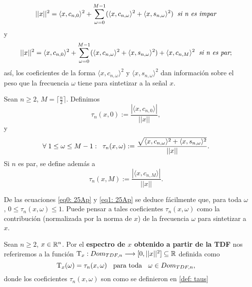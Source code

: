 \begin{equation}
\label{eq0: 25Ap}
||x||^{2} = \langle x , c_{n,0} \rangle^{2}+
\sum\limits_{\omega=0}^{M-1}(\langle x , c_{n,\omega} \rangle^{2} + 
\langle x , s_{n,\omega} \rangle^{2})
\hspace{0.2cm} \textit{si n es impar} 
\end{equation}
y
\begin{equation}
\label{eq1: 25Ap}
||x||^{2} = \langle x , c_{n,0} \rangle^{2}+
\sum\limits_{\omega=0}^{M-1}(\langle x , c_{n,\omega} \rangle^{2} + 
\langle x , s_{n,\omega} \rangle^{2})
+ \langle x , c_{n,M} \rangle^{2}
\hspace{0.2cm} \textit{si n es par};
\end{equation}
así, los coeficientes de la forma
$\langle x , c_{n,\omega} \rangle^{2}$ y 
$\langle x , s_{n,\omega} \rangle^{2}$
dan información sobre el peso que la frecuencia
$\omega$ tiene para sintetizar a la señal $x$.


\begin{defi}
\label{def: taus}
Sean $n \geq 2$, $M = \lceil \frac{n}{2} \rceil $.
Definimos
	\[
	\tau_{n}(x, 0) := \frac{|\langle x, c_{n,0} \rangle|}{|| x ||} ,	
	\]
	y
	\[
	\forall 
	\hspace{0.1cm}	
	1 \leq \omega \leq M-1: \hspace{0.2cm} 
	\tau_{n}(x, \omega) := 
	\frac{\sqrt{
	\langle x, c_{n,\omega} \rangle^{2}+
	\langle x, s_{n,\omega} \rangle^{2}}}{||x||}.	
	\]	
		Si $n$ es par, se define además a
	\[
	\tau_{n}(x, M) := 
	\frac{ |\langle x, c_{n,M} \rangle| }{ ||x|| }.
	\]
\end{defi}
De las ecuaciones 
\eqref{eq0: 25Ap} y 
\eqref{eq1: 25Ap} se deduce
fácilmente que, para toda $\omega$, 
$0 \leq \tau_{n}(x, \omega) \leq 1$. Puede pensar
a tales coeficientes $\tau_{n}(x, \omega)$ como la
contribución (normalizada por la norma de $x$)
de la frecuencia $\omega$ para sintetizar a $x$.


\begin{defi}
\label{def: espectro DFT}
Sean $n \geq 2$,  $x \in \mathbb{R}^{n}$. Por el 
\textbf{espectro de $x$ 
obtenido a partir de la TDF} nos referiremos
a la 
función 
$\mathrm{T}_{x} : Dom_{TDF, n} \longrightarrow [0, ||x||^{2}] \subseteq \mathbb{R}$
definida como
\[
\mathrm{T}_{x} (\omega) = \tau_{n}(x, \omega)
\hspace{0.2cm} \text{ para toda }
\hspace{0.2cm} \omega \in Dom_{TDF, n},
\]
donde los coeficientes $\tau_{n}(x, \omega)$
son como se definieron en \ref{def: taus}
\end{defi}

